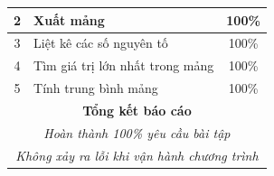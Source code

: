 \documentclass[a4paper,12pt]{report}
\begin{document}
\begin{center}
\begin{tabular}{|c|p{}|c|}
		2            & Xuất mảng                                                                            & 100\%            \\\hline
		3            & Liệt kê các số nguyên tố                                                             & 100\%            \\\hline
		4            & Tìm giá trị lớn nhất trong mảng                                                      & 100\%            \\\hline
		5            & Tính trung bình mảng                                                                 & 100\%            \\\hline
		\multicolumn{3}{|c|}{\textbf{Tổng kết báo cáo}}                                                                        \\
		\multicolumn{3}{|c|}{\textsl{Hoàn thành 100\% yêu cầu bài tập}}                                                        \\
		\multicolumn{3}{|c|}{\textsl{Không xảy ra lỗi khi vận hành chương trình}}                                              \\\hline
	\end{tabular}
\end{center}

\pagebreak
\end{document}
